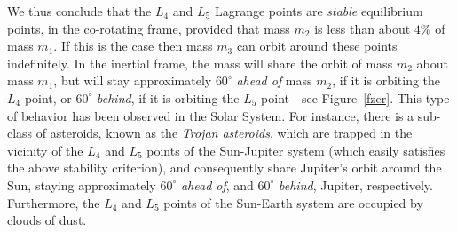 We thus conclude that the $L_4$ and $L_5$ Lagrange points are {\em stable}\/ equilibrium
points, in the co-rotating frame, provided that mass $m_2$ is less than about $4\%$ of
mass $m_1$. If this is the case then mass $m_3$ can orbit around these points
indefinitely. In the inertial frame, the mass will  share
the orbit of mass $m_2$ about mass $m_1$, but will stay approximately $60^\circ$ {\em ahead of}\/ 
mass $m_2$, if it is orbiting the $L_4$ point, or $60^\circ$ {\em behind}, if it is orbiting the $L_5$ point---see Figure~\ref{fzer}. This type of behavior has been observed in the Solar System. For instance,
there is a sub-class of asteroids, known as the {\em Trojan  asteroids}, which are trapped
in the vicinity of the $L_4$ and $L_5$ points of the Sun-Jupiter system (which easily
satisfies the above stability criterion), and consequently share Jupiter's orbit around the Sun,
staying approximately $60^\circ$ {\em ahead of}, and  $60^\circ$ {\em behind}, Jupiter, respectively.
Furthermore, the $L_4$ and $L_5$ points of the Sun-Earth system are occupied by clouds of dust.
